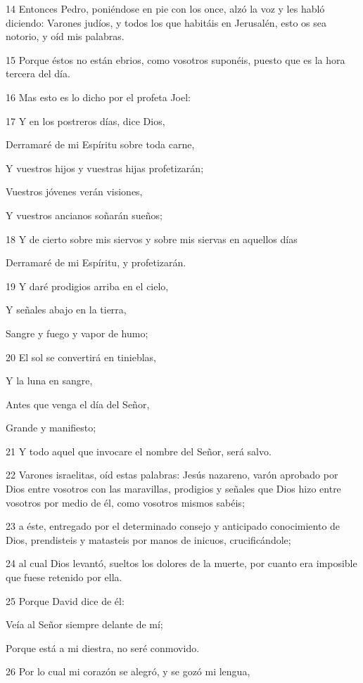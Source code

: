 \par 14 Entonces Pedro, poniéndose en pie con los once, alzó la voz y les habló diciendo: Varones judíos, y todos los que habitáis en Jerusalén, esto os sea notorio, y oíd mis palabras.
\par 15 Porque éstos no están ebrios, como vosotros suponéis, puesto que es la hora tercera del día.
\par 16 Mas esto es lo dicho por el profeta Joel:
\par 17 Y en los postreros días, dice Dios,
\par Derramaré de mi Espíritu sobre toda carne,
\par Y vuestros hijos y vuestras hijas profetizarán;
\par Vuestros jóvenes verán visiones,
\par Y vuestros ancianos soñarán sueños;
\par 18 Y de cierto sobre mis siervos y sobre mis siervas en aquellos días
\par Derramaré de mi Espíritu, y profetizarán.
\par 19 Y daré prodigios arriba en el cielo,
\par Y señales abajo en la tierra,
\par Sangre y fuego y vapor de humo;
\par 20 El sol se convertirá en tinieblas,
\par Y la luna en sangre,
\par Antes que venga el día del Señor,
\par Grande y manifiesto;
\par 21 Y todo aquel que invocare el nombre del Señor, será salvo.
\par 22 Varones israelitas, oíd estas palabras: Jesús nazareno, varón aprobado por Dios entre vosotros con las maravillas, prodigios y señales que Dios hizo entre vosotros por medio de él, como vosotros mismos sabéis;
\par 23 a éste, entregado por el determinado consejo y anticipado conocimiento de Dios, prendisteis y matasteis por manos de inicuos, crucificándole;
\par 24 al cual Dios levantó, sueltos los dolores de la muerte, por cuanto era imposible que fuese retenido por ella.
\par 25 Porque David dice de él:
\par Veía al Señor siempre delante de mí;
\par Porque está a mi diestra, no seré conmovido.
\par 26 Por lo cual mi corazón se alegró, y se gozó mi lengua,
